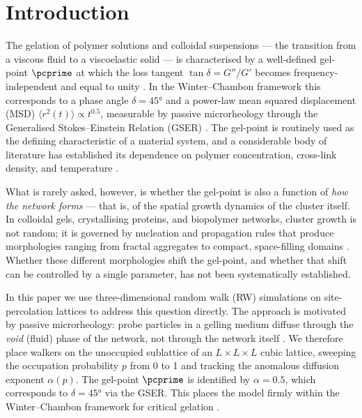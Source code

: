 \section{Introduction}

The gelation of polymer solutions and colloidal suspensions — the transition from a viscous fluid to a viscoelastic solid — is characterised by a well-defined gel-point $\pcprime$ at which the loss tangent $\tan\delta = G''/G'$ becomes frequency-independent and equal to unity \citep{Chambon1987,Winter1987}. In the Winter--Chambon framework this corresponds to a phase angle $\delta = 45°$ and a power-law mean squared displacement (MSD) $\langle r^2(t) \rangle \propto t^{0.5}$, measurable by passive microrheology through the Generalised Stokes--Einstein Relation (GSER) \citep{Mason1995,Mason2000,Squires2010}. The gel-point is routinely used as the defining characteristic of a material system, and a considerable body of literature has established its dependence on polymer concentration, cross-link density, and temperature \citep{Rubinstein2003,Larson1999}.

What is rarely asked, however, is whether the gel-point is also a function of \emph{how the network forms} — that is, of the spatial growth dynamics of the cluster itself. In colloidal gels, crystallising proteins, and biopolymer networks, cluster growth is not random; it is governed by nucleation and propagation rules that produce morphologies ranging from fractal aggregates to compact, space-filling domains \citep{Trappe2001,Gibaud2012,Ng2016}. Whether these different morphologies shift the gel-point, and whether that shift can be controlled by a single parameter, has not been systematically established.

In this paper we use three-dimensional random walk (RW) simulations on site-percolation lattices to address this question directly. The approach is motivated by passive microrheology: probe particles in a gelling medium diffuse through the \emph{void} (fluid) phase of the network, not through the network itself \citep{deBruyn2013,Rich2011,Oppong2006}. We therefore place walkers on the unoccupied sublattice of an $L \times L \times L$ cubic lattice, sweeping the occupation probability $p$ from 0 to 1 and tracking the anomalous diffusion exponent $\alpha(p)$. The gel-point $\pcprime$ is identified by $\alpha = 0.5$, which corresponds to $\delta = 45°$ via the GSER. This places the model firmly within the Winter--Chambon framework for critical gelation \citep{Winter1987,Chambon1987,Muthukumar1989}.

